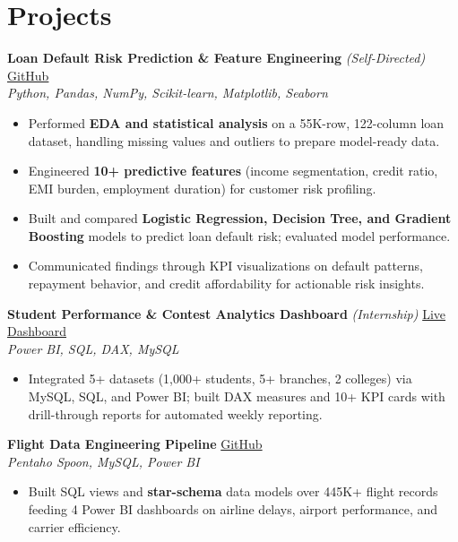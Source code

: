 \documentclass[a4paper,10pt]{article}
\begin{document}
\section{Projects}
\textbf{Loan Default Risk Prediction \& Feature Engineering} \textit{(Self-Directed)} \hfill \href{https://github.com/Rider-04/bank-loan-default-risk-analysis}{GitHub} \\
\textit{Python, Pandas, NumPy, Scikit-learn, Matplotlib, Seaborn}
\begin{itemize}[nosep,after=\strut, leftmargin=1em, itemsep=1pt,label=--]
\item Performed \textbf{EDA and statistical analysis} on a 55K-row, 122-column loan dataset, handling missing values and outliers to prepare model-ready data.
\item Engineered \textbf{10+ predictive features} (income segmentation, credit ratio, EMI burden, employment duration) for customer risk profiling.
\item Built and compared \textbf{Logistic Regression, Decision Tree, and Gradient Boosting} models to predict loan default risk; evaluated model performance.
\item Communicated findings through KPI visualizations on default patterns, repayment behavior, and credit affordability for actionable risk insights.
\end{itemize}
\vspace{2pt}
\textbf{Student Performance \& Contest Analytics Dashboard} \textit{(Internship)} \hfill \href{https://app.powerbi.com/links/q7Z6OSaJ-t?ctid=0d11b6ec-52ac-4a84-9442-43048f433ac9&pbi_source=linkShare}{Live Dashboard} \\
\textit{Power BI, SQL, DAX, MySQL}
\begin{itemize}[nosep,after=\strut, leftmargin=1em, itemsep=1pt,label=--]
\item Integrated 5+ datasets (1,000+ students, 5+ branches, 2 colleges) via MySQL, SQL, and Power BI; built DAX measures and 10+ KPI cards with drill-through reports for automated weekly reporting.
\end{itemize}
\vspace{2pt}
\textbf{Flight Data Engineering Pipeline} \hfill \href{https://github.com/Rider-04/flight-data-engineering-pipeline.git}{GitHub} \\
\textit{Pentaho Spoon, MySQL, Power BI}
\begin{itemize}[nosep,after=\strut, leftmargin=1em, itemsep=1pt,label=--]
\item Built SQL views and \textbf{star-schema} data models over 445K+ flight records feeding 4 Power BI dashboards on airline delays, airport performance, and carrier efficiency.
\end{itemize}
\vspace{2pt}
\end{document}

